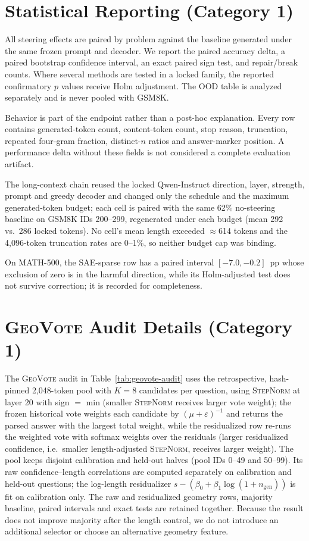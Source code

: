 \section{Statistical Reporting (Category 1)}
\label{app:statistics}

All steering effects are paired by problem against the baseline generated under
the same frozen prompt and decoder.  We report the paired accuracy delta, a
paired bootstrap confidence interval, an exact paired sign test, and repair/break
counts.  Where several methods are tested in a locked family, the reported
confirmatory $p$ values receive Holm adjustment.  The OOD table is analyzed
separately and is never pooled with GSM8K.

Behavior is part of the endpoint rather than a post-hoc explanation.  Every row
contains generated-token count, content-token count, stop reason, truncation,
repeated four-gram fraction, distinct-$n$ ratios and answer-marker position.  A performance delta without these fields is not considered a complete evaluation artifact.

The long-context chain reused the locked Qwen-Instruct direction, layer,
strength, prompt and greedy decoder and changed only the schedule and the
maximum generated-token budget; each cell is paired with the same 62\%
no-steering baseline on GSM8K IDs 200--299, regenerated under each budget
(mean 292 vs.\ 286 locked tokens).  No cell's mean length exceeded
$\approx$614 tokens and the 4,096-token truncation rates are 0--1\%, so
neither budget cap was binding.

On MATH-500, the SAE-sparse row has a paired interval $[-7.0,-0.2]$~pp whose
exclusion of zero is in the harmful direction, while its Holm-adjusted test
does not survive correction; it is recorded for completeness.

\section{\textsc{GeoVote} Audit Details (Category 1)}
\label{app:geovote-length}

The \textsc{GeoVote} audit in Table~\ref{tab:geovote-audit} uses the
retrospective, hash-pinned 2,048-token pool with $K{=}8$ candidates per question,
using \textsc{StepNorm} at layer 20 with sign $=$ min (smaller
\textsc{StepNorm} receives larger vote weight); the frozen historical vote
weights each candidate by $(\mu+\varepsilon)^{-1}$ and returns the parsed
answer with the largest total weight, while the residualized row re-runs the
weighted vote with softmax weights over the residuals (larger residualized
confidence, i.e.\ smaller length-adjusted \textsc{StepNorm}, receives larger
weight). The pool keeps disjoint calibration
and held-out halves (pool IDs 0--49 and 50--99). Its raw
confidence--length correlations are computed separately on calibration and
held-out questions; the log-length residualizer
$s-(\beta_0+\beta_1\log(1+n_{\mathrm{gen}}))$ is fit on calibration only.
The raw and residualized geometry rows, majority baseline, paired intervals and
exact tests are retained together. Because the result does not improve majority
after the length control, we do not introduce an additional selector or choose
an alternative geometry feature.


